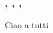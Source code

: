 \documentclass[ucs]{guitbeamer}
\author{\protect\Lsty{pippo} e i suoi amici}
\begin{document}
\begin{frame}
    \frametitle{, , , }
    Ciao a tutti
\end{frame}
\end{document}
